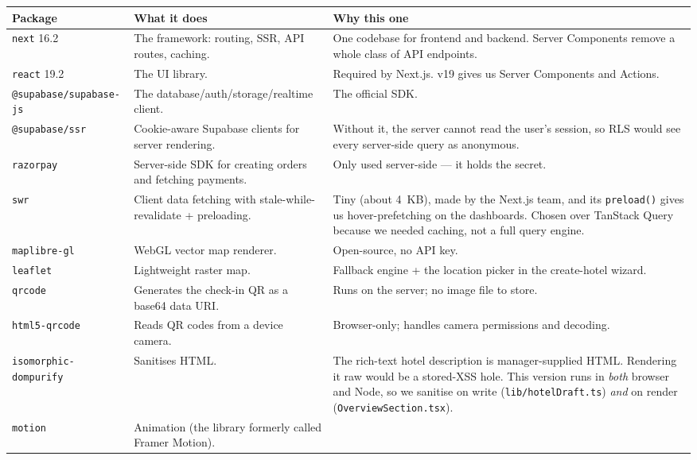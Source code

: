 \documentclass[11pt,a4paper]{article}
\newcommand{\file}[1]{\texttt{\small #1}}
\begin{document}
\begin{longtable}{@{}p{3.3cm}p{4.7cm}p{6.8cm}@{}}
\toprule
\textbf{Package} & \textbf{What it does} & \textbf{Why this one} \\
\midrule
\endhead
\texttt{next} 16.2 & The framework: routing, SSR, API routes, caching. &
One codebase for frontend and backend. Server Components remove a whole class of
API endpoints. \\
\addlinespace
\texttt{react} 19.2 & The UI library. & Required by Next.js. v19 gives us Server
Components and Actions. \\
\addlinespace
\texttt{@supabase/supabase-js} & The database/auth/storage/realtime client. &
The official SDK. \\
\addlinespace
\texttt{@supabase/ssr} & Cookie-aware Supabase clients for server rendering. &
Without it, the server cannot read the user's session, so RLS would see every
server-side query as anonymous. \\
\addlinespace
\texttt{razorpay} & Server-side SDK for creating orders and fetching payments. &
Only used server-side --- it holds the secret. \\
\addlinespace
\texttt{swr} & Client data fetching with stale-while-revalidate + preloading. &
Tiny (about 4~KB), made by the Next.js team, and its \texttt{preload()} gives us
hover-prefetching on the dashboards. Chosen over TanStack Query because we needed
caching, not a full query engine. \\
\addlinespace
\texttt{maplibre-gl} & WebGL vector map renderer. & Open-source, no API key. \\
\addlinespace
\texttt{leaflet} & Lightweight raster map. & Fallback engine + the location picker
in the create-hotel wizard. \\
\addlinespace
\texttt{qrcode} & Generates the check-in QR as a base64 data URI. & Runs on the
server; no image file to store. \\
\addlinespace
\texttt{html5-qrcode} & Reads QR codes from a device camera. & Browser-only;
handles camera permissions and decoding. \\
\addlinespace
\texttt{isomorphic-dompurify} & Sanitises HTML. & The rich-text hotel description
is manager-supplied HTML. Rendering it raw would be a stored-XSS hole. This
version runs in \emph{both} browser and Node, so we sanitise on write
(\file{lib/hotelDraft.ts}) \emph{and} on render
(\file{OverviewSection.tsx}). \\
\addlinespace
\texttt{motion} & Animation (the library formerly called Framer Motion). &

\end{longtable}
\end{document}
